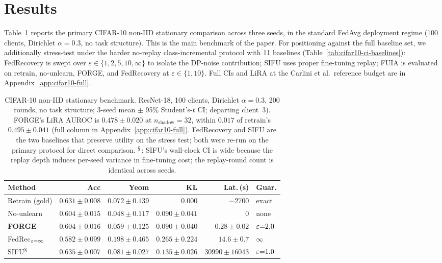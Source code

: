 \section{Results}
\label{sec:results}

Table~\ref{tab:cifar10-benchmark} reports the primary CIFAR-10 non-IID stationary
comparison across three seeds, in the standard FedAvg deployment regime (100
clients, Dirichlet $\alpha{=}0.3$, no task structure). This is the main benchmark
of the paper. For positioning against the full baseline set, we additionally
stress-test under the harder no-replay class-incremental protocol with 11
baselines (Table~\ref{tab:cifar10-ci-baselines}): FedRecovery is swept over
$\varepsilon \in \{1, 2, 5, 10, \infty\}$ to isolate the DP-noise contribution;
SIFU uses proper fine-tuning replay; FUIA is evaluated on retrain, no-unlearn,
FORGE, and FedRecovery at $\varepsilon \in \{1, 10\}$. Full CIs and LiRA at the
Carlini et al.\ reference budget are in Appendix~\ref{app:cifar10-full}.

\begin{table}[t]
\centering
\scriptsize
\setlength{\tabcolsep}{3pt}
\begin{tabular}{lrrrrl}
\toprule
Method & Acc & Yeom & KL & Lat.\,(s) & Guar. \\
\midrule
Retrain (gold)          & $0.631 \pm 0.008$ & $0.072 \pm 0.139$ & $0.000$ & ${\sim}2700$ & exact \\
No-unlearn              & $0.604 \pm 0.015$ & $0.048 \pm 0.117$ & $0.090 \pm 0.041$ & $0$ & none  \\
\textbf{FORGE}          & $\mathbf{0.604 \pm 0.016}$ & $\mathbf{0.059 \pm 0.125}$ & $\mathbf{0.090 \pm 0.040}$ & $\mathbf{0.28 \pm 0.02}$ & $\varepsilon{=}2.0$ \\
\midrule
FedRec$_{\varepsilon{=}\infty}$ & $0.582 \pm 0.099$ & $0.198 \pm 0.465$ & $0.265 \pm 0.224$ & $14.6 \pm 0.7$ & $\infty$ \\
SIFU$^{\mathsection}$    & $0.635 \pm 0.007$ & $0.081 \pm 0.027$ & $0.135 \pm 0.026$ & $30990 \pm 16043$ & $\varepsilon{=}1.0$ \\
\bottomrule
\end{tabular}
\caption{CIFAR-10 non-IID stationary benchmark. ResNet-18, 100 clients, Dirichlet
$\alpha{=}0.3$, 200 rounds, no task structure; 3-seed mean $\pm$ 95\%
Student's-$t$ CI; departing client~3). FORGE's LiRA AUROC is
$0.478 \pm 0.020$ at $n_\mathrm{shadow}{=}32$, within $0.017$ of retrain's
$0.495 \pm 0.041$ (full column in Appendix~\ref{app:cifar10-full}). FedRecovery and
SIFU are the two baselines that preserve utility on the stress test; both
were re-run on the primary protocol for direct comparison.
$^{\mathsection}$: SIFU's wall-clock CI is wide because the replay depth
induces per-seed variance in fine-tuning cost; the replay-round count is
identical across seeds.}
\label{tab:cifar10-benchmark}
\end{table}

